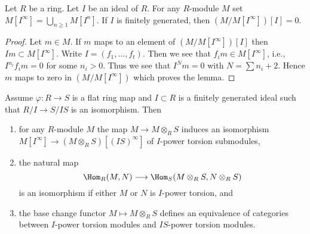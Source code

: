 \begin{lemma}
\label{lemma-divide-by-torsion}
Let $R$ be a ring. Let $I$ be an ideal of $R$. For any $R$-module $M$
set $M[I^\infty] = \bigcup_{n \geq 1} M[I^n]$.
If $I$ is finitely generated, then $(M/M[I^\infty])[I] = 0$.
\end{lemma}

\begin{proof}
Let $m \in M$. If $m$ maps to an element of $(M/M[I^\infty])[I]$
then $Im \subset M[I^\infty]$.
Write $I = (f_1, \ldots, f_t)$. Then we see that
$f_i m \in M[I^\infty]$, i.e., $I^{n_i}f_i m = 0$ for some $n_i > 0$.
Thus we see that $I^Nm = 0$ with $N = \sum n_i + 2$.
Hence $m$ maps to zero in $(M/M[I^\infty])$ which proves the lemma.
\end{proof}

\begin{lemma}
\label{lemma-neighbourhood-equivalence}
Assume $\varphi : R \to S$ is a flat ring map and $I \subset R$ is a
finitely generated ideal such that $R/I \to S/IS$ is an isomorphism. Then
\begin{enumerate}
\item for any $R$-module $M$ the map $M \to M \otimes_R S$ induces
an isomorphism
$M[I^\infty] \to (M \otimes_R S)[(IS)^\infty]$ of $I$-power
torsion submodules,
\item the natural map
$$
\Hom_R(M, N) \longrightarrow \Hom_S(M \otimes_R S, N \otimes_R S)
$$
is an isomorphism if either $M$ or $N$ is $I$-power torsion, and
\item the base change functor $M \mapsto M \otimes_R S$ defines an
equivalence of categories between $I$-power torsion modules
and $IS$-power torsion modules.
\end{enumerate}
\end{lemma}

